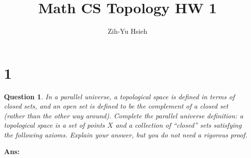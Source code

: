 \documentclass{article}
\title{Math CS Topology HW 1}
\author{Zih-Yu Hsieh}
\newtheorem{question}{Question}
\begin{document}
\maketitle

\section*{1}
\begin{question}
    In a parallel universe, a topological space is defined in terms of closed sets,
    and an open set is defined to be the complement of a closed set (rather than
    the other way around). Complete the parallel universe definition: a topological
    space is a set of points $ X$ and a collection of “closed” sets satisfying the following
    axioms. Explain your answer, but you do not need a rigorous proof.
\end{question}

\textbf{Ans:}
\end{document}
